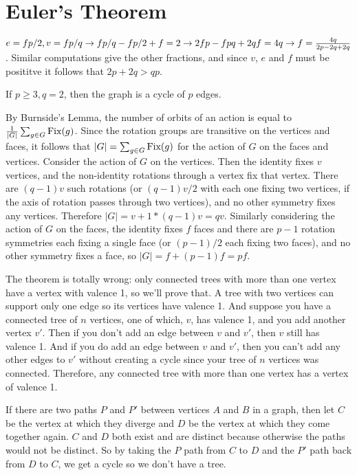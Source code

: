 \documentclass[11pt, oneside]{article}   	%
\begin{document}
\section{Euler's Theorem}
\be
\item $e=fp/2, v=fp/q \rightarrow fp/q - fp/2 + f = 2 \rightarrow 2fp - fpq + 2qf = 4q \rightarrow f = \frac{4q}{2p-2q+2q}$. Similar computations give the other fractions, and since $v$, $e$ and $f$ must be posititve it follows that $2p+2q>qp$.
\item If $p\ge3, q=2$, then the graph is a cycle of $p$ edges.
\item By Burnside's Lemma, the number of orbits of an action is equal to $\frac{1}{|G|}\sum_{g\in G}\text{Fix}(g)$. Since the rotation groups are transitive on the vertices and faces, it follows that $|G| = \sum_{g\in G}\text{Fix}(g)$ for the action of $G$ on the faces and vertices. Consider the action of $G$ on the vertices. Then the identity fixes $v$ vertices, and the non-identity rotations through a vertex fix that vertex. There are $(q-1)v$ such rotations (or $(q-1)v/2$ with each one fixing two vertices, if the axis of rotation passes through two vertices), and no other symmetry fixes any vertices. Therefore $|G| = v + 1*(q-1)v = qv$. Similarly considering the action of $G$ on the faces, the identity fixes $f$ faces and there are $p-1$ rotation symmetries each fixing a single face (or $(p-1)/2$ each fixing two faces), and no other symmetry fixes a face, so $|G| = f + (p-1)f = pf$. 
\item The theorem is totally wrong: only connected trees with more than one vertex have a vertex with valence 1, so we'll prove that. A tree with two vertices can support only one edge so its vertices have valence 1. And suppose you have a connected tree of $n$ vertices, one of which, $v$, has valence 1, and you add another vertex $v'$. Then if you don't add an edge between $v$ and $v'$, then $v$ still has valence 1. And if you do add an edge between $v$ and $v'$, then you can't add any other edges to $v'$ without creating a cycle since your tree of $n$ vertices was connected. Therefore, any connected tree with more than one vertex has a vertex of valence 1.

If there are two paths $P$ and $P'$ between vertices $A$ and $B$ in a graph, then let $C$ be the vertex at which they diverge and $D$ be the vertex at which they come together again. $C$ and $D$ both exist and are distinct because otherwise the paths would not be distinct. So by taking the $P$ path from $C$ to $D$ and the $P'$ path back from $D$ to $C$, we get a cycle so we don't have a tree.
\ee
\end{document}
